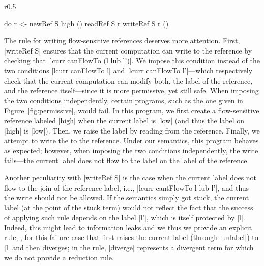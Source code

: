 \begin{wrapfigure}{r}{0.5\columnwidth}
\vspace{-15pt}
\begin{code}
do  r <- newRef S high ()
    readRef S r
    writeRef S r ()
\end{code}
\vspace{-15pt}
\caption{\small \label{fig:permissive} Permissiveness test.}
\end{wrapfigure}
%
The rule for writing flow-sensitive references deserves more
attention.
%
First, |writeRef S| ensures that the current computation can write to
the reference by checking that |lcurr canFlowTo (l lub l')|.
%
We impose this condition instead of the two conditions |lcurr
canFlowTo l| and |lcurr canFlowTo l'|---which respectively check that
the current computation can modify both, the label of the reference,
and the reference itself---since it is more permissive, yet still
safe.
%
When imposing the two conditions independently, certain programs, such
as the one given in Figure~\ref{fig:permissive}, would fail.
%
In this program, we first create a flow-sensitive reference labeled
|high| when the current label is |low| (and thus the label on |high|
is |low|).
%
Then, we raise the label by reading from the reference.
%
Finally, we attempt to write the to the reference.
%
Under our semantics, this program behaves as expected; however, when
imposing the two conditions independently, the write fails---the
current label does not flow to the label on the label of the
reference.
 
Another peculiarity with |writeRef S| is the case when the current label does not
flow to the join of the reference label, i.e., |lcurr cantFlowTo l lub l'|, and
thus the write should not be allowed.
%
If the semantics simply got stuck, the current label (at the point of
the stuck term) would
not reflect the fact that the success of applying such rule depends on the
label |l'|, which is itself protected by |l|.
%
Indeed, this might lead to information leaks and we thus we provide an
explicit rule, , for this failure case that
first raises the current label (through |unlabel|) to |l| and then
diverges; in the rule, |diverge| represents a divergent term for which
we do not provide a reduction rule.

